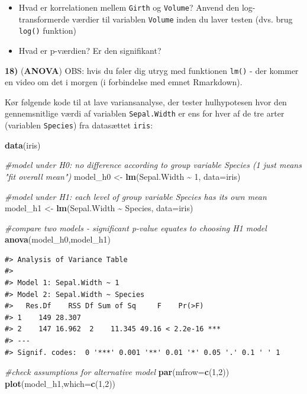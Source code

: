 \documentclass[
]{book}
\newenvironment{Shaded}{\begin{snugshade}}{\end{snugshade}}
\newcommand{\AttributeTok}[1]{\textcolor[rgb]{0.27,0.27,0.27}{#1}}
\newcommand{\CommentTok}[1]{\textcolor[rgb]{0.37,0.37,0.37}{\textit{#1}}}
\newcommand{\DecValTok}[1]{\textcolor[rgb]{0.06,0.06,0.06}{#1}}
\newcommand{\FunctionTok}[1]{\textcolor[rgb]{0.27,0.27,0.27}{\textbf{#1}}}
\newcommand{\NormalTok}[1]{#1}
\newcommand{\OtherTok}[1]{\textcolor[rgb]{0.37,0.37,0.37}{#1}}
\newcommand{\SpecialCharTok}[1]{\textcolor[rgb]{0.43,0.43,0.43}{\textbf{#1}}}
\providecommand{\tightlist}{%
  \setlength{\itemsep}{0pt}\setlength{\parskip}{0pt}}
\begin{document}
\begin{itemize}
\tightlist
\item
  Hvad er korrelationen mellem \texttt{Girth} og \texttt{Volume}? Anvend den log-transformerde værdier til variablen \texttt{Volume} inden du laver testen (dvs. brug \texttt{log()} funktion)
\item
  Hvad er p-værdien? Er den signifikant?
\end{itemize}

\textbf{18)} (\textbf{ANOVA}) OBS: hvis du føler dig utryg med funktionen \texttt{lm()} - der kommer en video om det i morgen (i forbindelse med emnet Rmarkdown).

Kør følgende kode til at lave variansanalyse, der tester hulhypotesen hvor den gennemsnitlige værdi af variablen \texttt{Sepal.Width} er ens for hver af de tre arter (variablen \texttt{Species}) fra datasættet \texttt{iris}:

\begin{Shaded}
\begin{Highlighting}[]
\FunctionTok{data}\NormalTok{(iris)}

\CommentTok{\#model under H0: no difference according to group variable Species (1 just means "fit overall mean")}
\NormalTok{model\_h0 }\OtherTok{\textless{}{-}} \FunctionTok{lm}\NormalTok{(Sepal.Width }\SpecialCharTok{\textasciitilde{}} \DecValTok{1}\NormalTok{, }\AttributeTok{data=}\NormalTok{iris) }

\CommentTok{\#model under H1: each level of group variable Species has its own mean}
\NormalTok{model\_h1 }\OtherTok{\textless{}{-}} \FunctionTok{lm}\NormalTok{(Sepal.Width }\SpecialCharTok{\textasciitilde{}}\NormalTok{ Species, }\AttributeTok{data=}\NormalTok{iris) }

\CommentTok{\#compare two models {-} significant p{-}value equates to choosing H1 model}
\FunctionTok{anova}\NormalTok{(model\_h0,model\_h1)}
\end{Highlighting}
\end{Shaded}

\begin{verbatim}
#> Analysis of Variance Table
#> 
#> Model 1: Sepal.Width ~ 1
#> Model 2: Sepal.Width ~ Species
#>   Res.Df    RSS Df Sum of Sq     F    Pr(>F)    
#> 1    149 28.307                                 
#> 2    147 16.962  2    11.345 49.16 < 2.2e-16 ***
#> ---
#> Signif. codes:  0 '***' 0.001 '**' 0.01 '*' 0.05 '.' 0.1 ' ' 1
\end{verbatim}

\begin{Shaded}
\begin{Highlighting}[]
\CommentTok{\#check assumptions for alternative model}
\FunctionTok{par}\NormalTok{(}\AttributeTok{mfrow=}\FunctionTok{c}\NormalTok{(}\DecValTok{1}\NormalTok{,}\DecValTok{2}\NormalTok{))}
\FunctionTok{plot}\NormalTok{(model\_h1,}\AttributeTok{which=}\FunctionTok{c}\NormalTok{(}\DecValTok{1}\NormalTok{,}\DecValTok{2}\NormalTok{))}
\end{Highlighting}
\end{Shaded}
\end{document}
